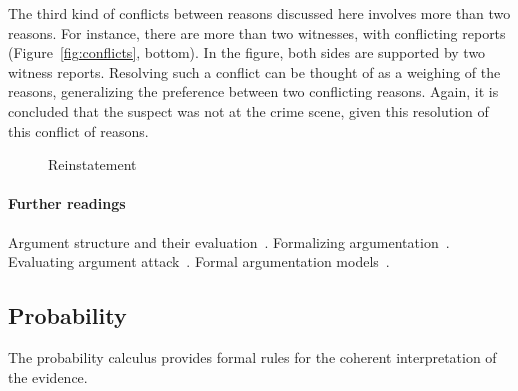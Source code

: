 \documentclass[10pt]{article}
\begin{document}
The third kind of conflicts between reasons discussed here involves more than two reasons. For instance, there are more than two witnesses, with conflicting reports (Figure~\ref{fig:conflicts}, bottom). In the figure, both sides are supported by two witness reports. Resolving such a conflict can be thought of as a weighing of the reasons, generalizing the preference between two conflicting reasons. Again, it is concluded that the suspect was not at the crime scene, given this resolution of this conflict of reasons.





\begin{figure}[bt]
\centering

\caption{Reinstatement\label{fig:reinstatement}}
\end{figure}


\paragraph{Further readings}
Argument structure and their evaluation~\citep{pollock1995}. Formalizing argumentation~\citep{prakkenVreeswijk2002}. Evaluating argument attack~\citep{dung1995}. 
Formal argumentation models~\citep{simariLoui1992, vreeswijk1997, prakken2010, verheij2003deflog, gordonEtal2007}. 





\subsection{Probability}

The probability calculus provides formal rules for the coherent interpretation of the evidence.

\end{document}
